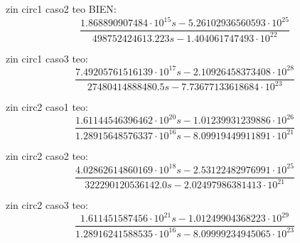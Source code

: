 zin circ1 caso2 teo BIEN:
\begin{equation}
\frac{1.868890907484 \cdot 10^{15} s - 5.26102936560593 \cdot 10^{25}}{498752424613.223 s - 1.404061747493 \cdot 10^{22}}
\end{equation}

zin circ1 caso3 teo:
\begin{equation}
\frac{7.49205761516139 \cdot 10^{17} s - 2.10926458373408 \cdot 10^{28}}{27480414888480.5 s - 7.73677133618684 \cdot 10^{23}}
\end{equation}


zin circ2 caso1 teo:
\begin{equation}
\frac{1.61144546396462 \cdot 10^{20} s - 1.01239931239886 \cdot 10^{26}}{1.28915648576337 \cdot 10^{16} s - 8.09919449911891 \cdot 10^{21}}
\end{equation}

zin circ2 caso2 teo:
\begin{equation}
\frac{4.02862614860169 \cdot 10^{18} s - 2.53122482976991 \cdot 10^{25}}{322290120536142.0 s - 2.02497986381413 \cdot 10^{21}}
\end{equation}


zin circ2 caso3 teo:
\begin{equation}
\frac{1.611451587456 \cdot 10^{21} s - 1.01249904368223 \cdot 10^{29}}{1.28916241588535 \cdot 10^{16} s - 8.09999234945065 \cdot 10^{23}}
\end{equation}

